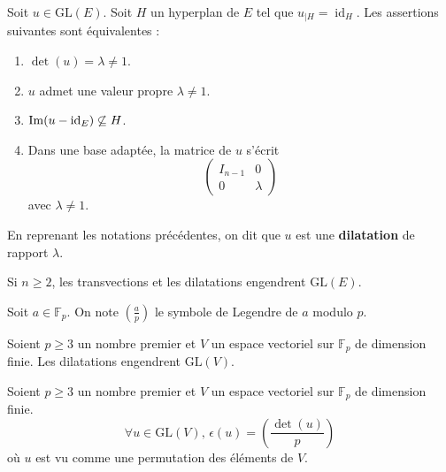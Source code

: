   \begin{proposition}
    Soit $u \in \mathrm{GL}(E)$. Soit $H$ un hyperplan de $E$ tel que $u_{|H} = \operatorname{id}_H$. Les assertions suivantes sont équivalentes :
    \begin{enumerate}[label={\bfseries(\roman*)}]
      \item $\det(u) = \lambda \neq 1$.
      \item $u$ admet une valeur propre $\lambda \neq 1$.
      \item $\mathrm{Im}(u - \operatorname{id}_E) \not\subseteq H$.
      \item Dans une base adaptée, la matrice de $u$ s'écrit
      \[
        \begin{pmatrix}
          I_{n-1} & 0 \\
          0 & \lambda
        \end{pmatrix}
      \]
      avec $\lambda \neq 1$.
    \end{enumerate}
  \end{proposition}

  \begin{definition}
    En reprenant les notations précédentes, on dit que $u$ est une \textbf{dilatation} de rapport $\lambda$.
  \end{definition}

  \begin{theorem}
    Si $n \geq 2$, les transvections et les dilatations engendrent $\mathrm{GL}(E)$.
  \end{theorem}


  \begin{notation}
    Soit $a \in \mathbb{F}_p$. On note $\left( \frac{a}{p} \right)$ le symbole de Legendre de $a$ modulo $p$.
  \end{notation}

  \begin{lemma}
    Soient $p \geq 3$ un nombre premier et $V$ un espace vectoriel sur $\mathbb{F}_p$ de dimension finie. Les dilatations engendrent $\mathrm{GL}(V)$.
  \end{lemma}


  \begin{application}
    Soient $p \geq 3$ un nombre premier et $V$ un espace vectoriel sur $\mathbb{F}_p$ de dimension finie.
    \[ \forall u \in \mathrm{GL}(V), \, \epsilon(u) = \left( \frac{\det(u)}{p} \right) \]
    où $u$ est vu comme une permutation des éléments de $V$.
  \end{application}

